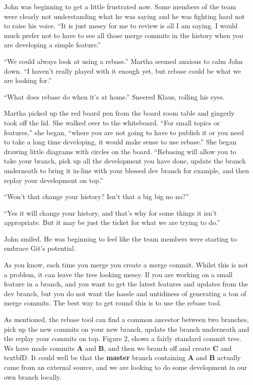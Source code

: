 \begin{trenches}
John was beginning to get a little frustrated now.  Some members of the team were clearly not understanding what he was saying and he was fighting hard not to raise his voice.  ``It is just messy for me to review is all I am saying.  I would much prefer not to have to see all those merge commits in the history when you are developing a simple feature.''

``We could always look at using a rebase.''  Martha seemed anxious to calm John down.  ``I haven't really played with it enough yet, but rebase could be what we are looking for.''

``What does rebase do when it's at home.''  Sneered Klaus, rolling his eyes.

Martha picked up the red board pen from the board room table and gingerly took off the lid.  She walked over to the whiteboard.  ``For small topics or features,'' she began, ``where you are not going to have to publish it or you need to take a long time developing, it would make sense to use rebase.''  She began drawing little diagrams with circles on the board.  ``Rebasing will allow you to take your branch, pick up all the development you have done, update the branch underneath to bring it in-line with your blessed dev branch for example, and then replay your development on top.''

``Won't that change your history?  Isn't that a big big no no?''

``Yes it will change your history, and that's why for some things it isn't appropriate.  But it may be just the ticket for what we are trying to do.''

John smiled.  He was beginning to feel like the team members were starting to embrace Git's potential. 
\end{trenches}

As you know, each time you merge you create a merge commit.  Whilst this is not a problem, it can leave the tree looking messy.  If you are working on a small feature in a branch, and you want to get the latest features and updates from the dev branch, but you do not want the hassle and untidiness of generating a ton of merge commits.  The best way to get round this is to use the rebase tool.

As mentioned, the rebase tool can find a common ancestor between two branches, pick up the new commits on your new branch, update the branch underneath and the replay your commits on top.  Figure 2, shows a fairly standard commit tree.  We have made commits \textbf{A} and \textbf{B}, and then we branch off and create \textbf{C} and textbf{D}.  It could well be that the \textbf{master} branch containing \textbf{A} and \textbf{B} actually came from an external source, and we are looking to do some development in our own branch locally.

